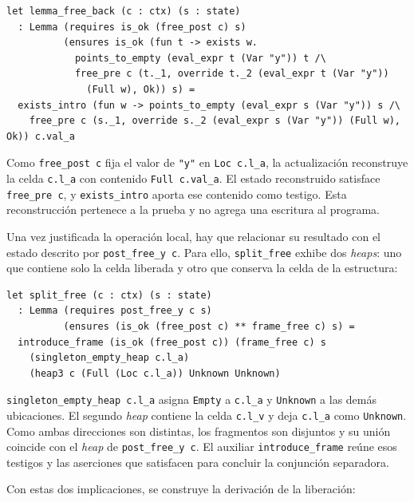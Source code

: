 \documentclass[a4paper,	11pt]{report}
\begin{document}
\begin{lstlisting}
let lemma_free_back (c : ctx) (s : state)
  : Lemma (requires is_ok (free_post c) s)
          (ensures is_ok (fun t -> exists w.
            points_to_empty (eval_expr t (Var "y")) t /\
            free_pre c (t._1, override t._2 (eval_expr t (Var "y"))
              (Full w), Ok)) s) =
  exists_intro (fun w -> points_to_empty (eval_expr s (Var "y")) s /\
    free_pre c (s._1, override s._2 (eval_expr s (Var "y")) (Full w), Ok)) c.val_a
\end{lstlisting}
Como \lstinline|free_post c| fija el valor de \lstinline|"y"| en \lstinline|Loc c.l_a|,
la actualización reconstruye la celda \lstinline|c.l_a| con contenido \lstinline|Full c.val_a|.
El estado reconstruido satisface \lstinline|free_pre c|,
y \lstinline|exists_intro| aporta ese contenido como testigo.
Esta reconstrucción pertenece a la prueba y no agrega una escritura al programa.

Una vez justificada la operación local,
hay que relacionar su resultado con el estado descrito por \lstinline|post_free_y c|.
Para ello,
\lstinline|split_free| exhibe dos \emph{heaps}:
uno que contiene solo la celda liberada y otro que conserva la celda de la estructura:

\begin{lstlisting}
let split_free (c : ctx) (s : state)
  : Lemma (requires post_free_y c s)
          (ensures (is_ok (free_post c) ** frame_free c) s) =
  introduce_frame (is_ok (free_post c)) (frame_free c) s
    (singleton_empty_heap c.l_a)
    (heap3 c (Full (Loc c.l_a)) Unknown Unknown)
\end{lstlisting}
\lstinline|singleton_empty_heap c.l_a| asigna \lstinline|Empty| a \lstinline|c.l_a| y \lstinline|Unknown| a las demás ubicaciones.
El segundo \emph{heap} contiene la celda \lstinline|c.l_v| y deja \lstinline|c.l_a| como \lstinline|Unknown|.
Como ambas direcciones son distintas,
los fragmentos son disjuntos y su unión coincide con el \emph{heap} de \lstinline|post_free_y c|.
El auxiliar \lstinline|introduce_frame| reúne esos testigos y las aserciones que satisfacen para concluir la conjunción separadora.

Con estas dos implicaciones,
se construye la derivación de la liberación:
\end{document}

